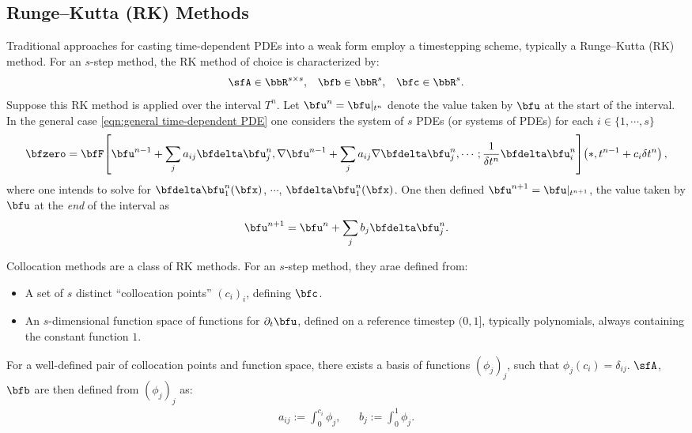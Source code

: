 \subsection{Runge--Kutta (RK) Methods}\label{cha:RK methods}
    Traditional approaches for casting time-dependent PDEs into a weak form employ a timestepping scheme, typically a Runge--Kutta (RK) method. For an $s$-step method, the RK method of choice is characterized by:
    \begin{align}
        \sfA  \in  \bbR^{s \times s},  &&
        \bfb  \in  \bbR^{s},  &&
        \bfc  \in  \bbR^{s}.
    \end{align}
    Suppose this RK method is applied over the interval $T^{n}$. Let $\bfu^{n}  =  \bfu|_{t^{n}}$ denote the value taken by $\bfu$ at the start of the interval. In the general case \ref{eqn:general time-dependent PDE} one considers the system of $s$ PDEs (or systems of PDEs) for each $i  \in  \{1, \cdots, s\}$ 
    \begin{equation}
        \bfzero  =  \bfF\!\left[\bfu^{n - 1} + \sum_{j}a_{ij}\bfdelta\bfu^{n}_{j}, \nabla\bfu^{n - 1} + \sum_{j}a_{ij}\nabla\bfdelta\bfu^{n}_{j}, \cdots; \frac{1}{\delta t^{n}}\bfdelta\bfu^{n}_{i}\right]\!\left(*, t^{n - 1} + c_{i}\delta t^{n}\right),
    \end{equation}
    where one intends to solve for $\bfdelta\bfu^{n}_{1}(\bfx)$, $\cdots$, $\bfdelta\bfu^{n}_{1}(\bfx)$. One then defined $\bfu^{n + 1}  =  \bfu|_{t^{n + 1}}$, the value taken by $\bfu$ at the \emph{end} of the interval as
    \begin{equation}
        \bfu^{n + 1}  =  \bfu^{n} + \sum_{j}b_{j}\bfdelta\bfu^{n}_{j}.
    \end{equation}

    \line
    
    \begin{definition}
        Collocation methods are a class of RK methods. For an $s$-step method, they arae defined from:
        \begin{itemize}
            \item  A set of $s$ distinct ``collocation points'' $(c_{i})_{i}$, defining $\bfc$.
            \item  An $s$-dimensional function space of functions for $\partial_{t}\bfu$, defined on a reference timestep $(0, 1]$, typically polynomials, always containing the constant function $1$.
        \end{itemize}
        For a well-defined pair of collocation points and function space, there exists a basis of functions $(\phi_{j})_{j}$, such that $\phi_{j}(c_{i})  =  \delta_{ij}$. $\sfA$, $\bfb$ are then defined from $(\phi_{j})_{j}$ as:
        \begin{align}
            a_{ij}  :=  \int_{0}^{c_{i}}\phi_{j},  &&
            b_{j}   :=  \int_{0}^{1}\phi_{j}.
        \end{align}
    \end{definition}
    
